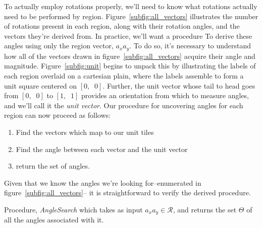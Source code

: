 To actually employ rotations properly, we'll need to know what rotations actually need to be performed by
region.  Figure~\ref{subfig:all_vectors} illustrates the number of rotations present in each region, along
with their rotation angles, and the vectors they're derived from.  In practice, we'll want a procedure To
derive these angles using only the region vector, $a_xa_y$.  To do so, it's necessary to understand how
all of the vectors drawn in figure~\ref{subfig:all_vectors} acquire their angle and magnitude.
Figure~\ref{subfig:unit} begins to unpack this by illustrating the labels of each region overlaid on a
cartesian plain, where the labels assemble to form a unit square centered on $[0, \;\; 0]$.
Further, the unit vector whose
tail to head goes from $[0, \;\; 0]$ to $[1, \;\; 1]$ provides an orientation from which to measure angles,
and we'll call it the {\it unit vector}.  Our procedure for uncovering angles
for each region can now proceed as follows:
\begin{enumerate}
  \item Find the vectors which map to our unit tiles
  \item Find the angle between each vector and the unit vector
  \item return the set of angles.
\end{enumerate}
Given that we know the angles we're looking for--enumerated in figure~\ref{subfig:all_vectors}--
it is straightforward to verify the derived procedure.

\begin{algorithm}[hb]
  \setcounter{AlgoLine}{0}
  \caption{Procedure, {\it AngleSearch} which takes as input $a_xa_y \in \mathcal{R}$,
  and returns the set $\Theta$ of all the angles associated with it.}
  \label{alg:angle_search}
\end{algorithm}

